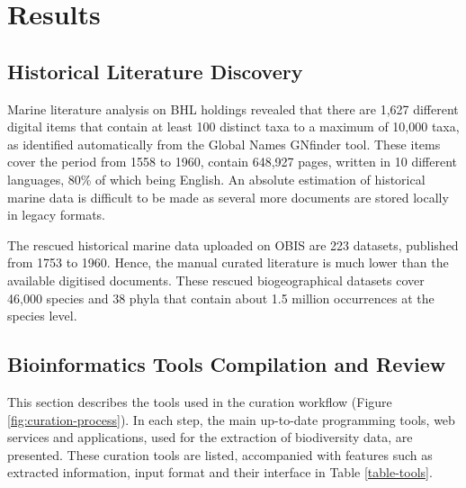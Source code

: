 \section{Results}
\label{sec:deco-results}

   \subsection{Historical Literature Discovery}

Marine literature analysis on BHL holdings revealed that there are
1,627 different digital items that contain at least 100 distinct taxa to a
maximum of 10,000 taxa, as identified automatically from the Global Names
GNfinder tool. These items cover the period from 1558 to 1960, contain 648,927
pages, written in 10 different languages, 80\% of which being English. An
absolute estimation of historical marine data is difficult to be made as
several more documents are stored locally in legacy formats.

The rescued historical marine data uploaded on OBIS are 223 datasets, published
from 1753 to 1960. Hence, the manual curated literature is much lower than the
available digitised documents. These rescued biogeographical datasets cover
46,000 species and 38 phyla that contain about 1.5 million occurrences at the
species level.

    \subsection{Bioinformatics Tools Compilation and Review}

This section describes the tools used in the curation workflow
(Figure \ref{fig:curation-process}). In each step, the main up-to-date
programming tools, web services and applications, used for the extraction of
biodiversity data, are presented. These curation tools are listed, accompanied
with features such as extracted information, input format and their interface
in Table \ref{table-tools}.


